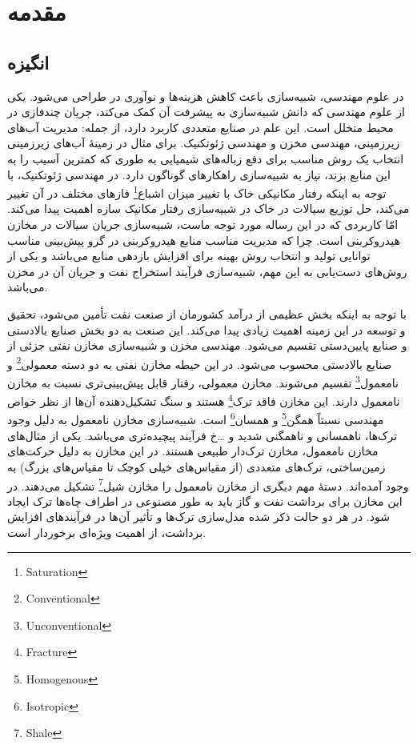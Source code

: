 \chapter{مقدمه}
\label{ch:fasl1}

\section{انگیزه}
در  علوم مهندسی، شبیه‌سازی باعث کاهش هزینه‌ها و نوآوری در طراحی می‌شود. یکی از علوم مهندسی که دانش شبیه‌سازی 
به پیشرفت آن کمک می‌کند، جریان چند‌فازی در محیط متخلل است. این علم در صنایع متعددی کاربرد دارد، از جمله: مدیریت آب‌های
 زیرزمینی، مهندسی مخزن و مهندسی ژئوتکنیک. برای مثال در زمینهٔ آب‌های زیرزمینی انتخاب یک روش مناسب برای دفع زباله‌های 
 شیمیایی به طوری که کمترین آسیب را به این منابع بزند، نیاز به شبیه‌سازی راهکارهای گوناگون دارد\cite{basthabil}. 
 در مهندسی ژئوتکنیک، با توجه به اینکه رفتار مکانیکی خاک با تغییر میزان اشباع\footnote{Saturation} فاز‌های مختلف در آن تغییر می‌کند، 
 حل توزیع سیالات در خاک در شبیه‌سازی رفتار مکانیک سازه اهمیت پیدا می‌کند. امّا کاربردی که در این رساله مورد توجه ماست، 
 شبیه‌سازی جریان سیالات در مخازن هیدروکربنی است. چرا که مدیریت مناسب منابع هیدروکربنی در گرو پیش‌بینی مناسب توانایی تولید و 
 انتخاب روش بهینه برای افزایش بازدهی منابع می‌باشد و یکی از روش‌های دست‌یابی به این مهم، شبیه‌سازی فرآیند استخراج نفت و 
 جریان آن در مخزن می‌باشد.

با توجه به اینکه بخش عظیمی از درآمد کشورمان از صنعت نفت تأمین می‌شود، تحقیق و توسعه در این زمینه اهمیت زیادی پیدا می‌کند. این صنعت به دو بخش صنایع بالادستی و صنایع پایین‌دستی تقسیم می‌شود. مهندسی مخزن و شبیه‌سازی مخازن نفتی جزئی از صنایع بالادستی محسوب می‌شود. در این حیطه مخازن نفتی به دو دسته معمولی\footnote{Conventional} و نامعمول\footnote{Unconventional} تقسیم می‌شوند. مخازن معمولی، رفتار قابل پیش‌بینی‌تری نسبت به مخازن نامعمول دارند. این مخازن فاقد ترک\footnote{Fracture} هستند و سنگ تشکیل‌دهنده آن‌ها از نظر خواص مهندسی نسبتاً همگن\footnote{Homogenous} و همسان\footnote{Isotropic} است. شبیه‌سازی مخازن نامعمول به دلیل وجود ترک‌ها، ناهمسانی و ناهمگنی شدید و \dots‌خ{} فرآیند پیچیده‌تری می‌باشد. یکی از مثال‌های مخازن نامعمول، مخازن ترک‌دار طبیعی هستند. در این مخازن به دلیل حرکت‌های زمین‌ساختی،  ترک‌های متعددی (از مقیاس‌های خیلی کوچک تا مقیاس‌های بزرگ) به وجود آمده‌اند. دستهٔ مهم دیگری از مخازن نامعمول را مخازن شیل\footnote{Shale} تشکیل می‌دهند. در این مخازن برای برداشت نفت و گاز باید به طور مصنوعی در اطراف چاه‌ها ترک ایجاد شود. در هر دو حالت ذکر شده مدل‌سازی ترک‌ها و تأثیر آن‌ها در فرآیند‌های افزایش برداشت، از اهمیت ویژه‌ای برخوردار است.

